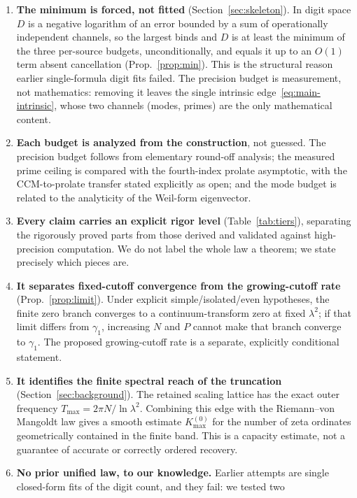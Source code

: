 \documentclass[11pt,a4paper]{article}
\begin{document}
\begin{enumerate}
\item \textbf{The minimum is forced, not fitted} (Section~\ref{sec:skeleton}).
  In digit space $D$ is a negative logarithm of an error bounded by a sum of
  operationally independent channels, so the largest binds and $D$ is at least
  the minimum of the three per-source budgets, unconditionally, and equals it up
  to an $O(1)$ term absent cancellation (Prop.~\ref{prop:min}). This is the
  structural reason earlier single-formula digit fits failed. The precision budget is measurement, not
  mathematics: removing it leaves the single intrinsic
  edge~\eqref{eq:main-intrinsic}, whose two channels (modes, primes) are the only
  mathematical content.
\item \textbf{Each budget is analyzed from the construction}, not guessed. The
  precision budget follows from elementary round-off analysis; the measured
  prime ceiling is compared with the fourth-index prolate asymptotic, with the
  CCM-to-prolate transfer stated explicitly as open; and the mode budget is
  related to the analyticity of the Weil-form eigenvector.
\item \textbf{Every claim carries an explicit rigor level} (Table~\ref{tab:tiers}),
  separating the rigorously proved parts from those derived and validated
  against high-precision computation. We do not label the whole law a
  theorem; we state precisely which pieces are.
\item \textbf{It separates fixed-cutoff convergence from the growing-cutoff
  rate} (Prop.~\ref{prop:limit}). Under explicit simple/isolated/even
  hypotheses, the finite zero branch converges to a continuum-transform zero
  at fixed $\lambda^2$; if that limit differs from $\gamma_1$, increasing $N$
  and $P$ cannot make that branch converge to $\gamma_1$. The proposed
  growing-cutoff rate is a separate, explicitly conditional statement.
\item \textbf{It identifies the finite spectral reach of the truncation}
  (Section~\ref{sec:background}). The retained scaling lattice has the exact
  outer frequency $T_{\max}=2\pi N/\ln\lambda^2$. Combining this edge with the
  Riemann--von Mangoldt law gives a smooth estimate $K_{\max}^{(0)}$ for the
  number of zeta ordinates geometrically contained in the finite band. This is
  a capacity estimate, not a guarantee of accurate or correctly ordered
  recovery.
\item \textbf{No prior unified law, to our knowledge.} Earlier attempts are
  single closed-form fits of the digit count, and they fail: we tested two

\end{enumerate}
\end{document}
